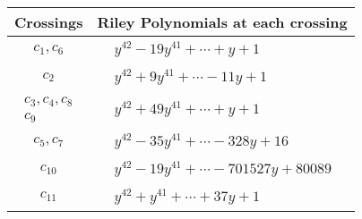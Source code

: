 \documentclass[1p]{elsarticle_modified}
\theoremstyle{definition}
\begin{document}
\begin{tabular}{m{50pt}|m{274pt}}
Crossings & \hspace{64pt}Riley Polynomials at each crossing \\
\hline $$\begin{aligned}c_{1},c_{6}\end{aligned}$$&$\begin{aligned}
&y^{42}-19 y^{41}+\cdots+y+1
\end{aligned}$\\
\hline $$\begin{aligned}c_{2}\end{aligned}$$&$\begin{aligned}
&y^{42}+9 y^{41}+\cdots-11 y+1
\end{aligned}$\\
\hline $$\begin{aligned}c_{3},c_{4},c_{8}\\c_{9}\end{aligned}$$&$\begin{aligned}
&y^{42}+49 y^{41}+\cdots+y+1
\end{aligned}$\\
\hline $$\begin{aligned}c_{5},c_{7}\end{aligned}$$&$\begin{aligned}
&y^{42}-35 y^{41}+\cdots-328 y+16
\end{aligned}$\\
\hline $$\begin{aligned}c_{10}\end{aligned}$$&$\begin{aligned}
&y^{42}-19 y^{41}+\cdots-701527 y+80089
\end{aligned}$\\
\hline $$\begin{aligned}c_{11}\end{aligned}$$&$\begin{aligned}
&y^{42}+y^{41}+\cdots+37 y+1
\end{aligned}$\\
\hline
\end{tabular}
\vskip 2pc
\end{document}

